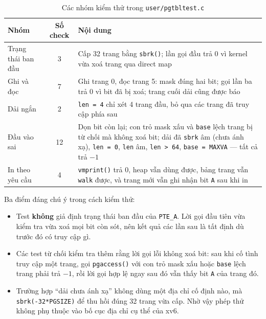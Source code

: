 \begin{table}[H]
    \centering
    \renewcommand{\arraystretch}{1.3}
    \setlength{\tabcolsep}{8pt}
    \begin{tabular}{|l|c|p{8.5cm}|}
        \hline
        \rowcolor[rgb]{0.8, 0.9, 1.0}
        \textbf{Nhóm} & \textbf{Số check} & \textbf{Nội dung} \\ \hline
        Trạng thái ban đầu & 3 & Cấp 32 trang bằng \texttt{sbrk()}; lần gọi đầu trả 0 vì kernel vừa xoá trang qua direct map\\ \hline
        Ghi và đọc & 7 & Ghi trang 0, đọc trang 5: mask đúng hai bit; gọi lần ba trả 0 vì bit đã bị xoá; trang cuối dải cũng được báo \\ \hline
        Dải ngắn & 2 & \texttt{len = 4} chỉ xét 4 trang đầu, bỏ qua các trang đã truy cập phía sau \\ \hline
        Đầu vào sai & 12 & Dọn bit còn lại; con trỏ mask xấu và \texttt{base} lệch trang bị từ chối mà không xoá bit; dải đã \texttt{sbrk} âm (chưa ánh xạ), \texttt{len = 0}, \texttt{len} âm, \texttt{len > 64}, \texttt{base = MAXVA} --- tất cả trả $-1$ \\ \hline
        In theo yêu cầu & 4 & \texttt{vmprint()} trả 0, heap vẫn dùng được, bảng trang vẫn \texttt{walk} được, và trang mới vẫn ghi nhận bit \texttt{A} sau khi in \\ \hline
    \end{tabular}
    \caption{Các nhóm kiểm thử trong \texttt{user/pgtbltest.c}}
\end{table}

Ba điểm đáng chú ý trong cách kiểm thử:

\begin{itemize}[itemsep=0pt, topsep=2.5pt, leftmargin=1.5cm]
    \item Test \textbf{không} giả định trạng thái ban đầu của \texttt{PTE\_A}. Lời gọi đầu tiên vừa kiểm tra vừa xoá mọi bit còn sót, nên kết quả các lần sau là tất định dù trước đó có truy cập gì.
    \item Các test từ chối kiểm tra thêm rằng lời gọi lỗi không xoá bit: sau khi cố tình truy cập một trang, gọi \texttt{pgaccess()} với con trỏ mask xấu hoặc \texttt{base} lệch trang phải trả $-1$, rồi lời gọi hợp lệ ngay sau đó vẫn thấy bit \texttt{A} của trang đó.
    \item Trường hợp ``dải chưa ánh xạ'' không dùng một địa chỉ cố định nào, mà \texttt{sbrk(-32*PGSIZE)} để thu hồi đúng 32 trang vừa cấp. Nhờ vậy phép thử không phụ thuộc vào bố cục địa chỉ cụ thể của xv6.
\end{itemize}

